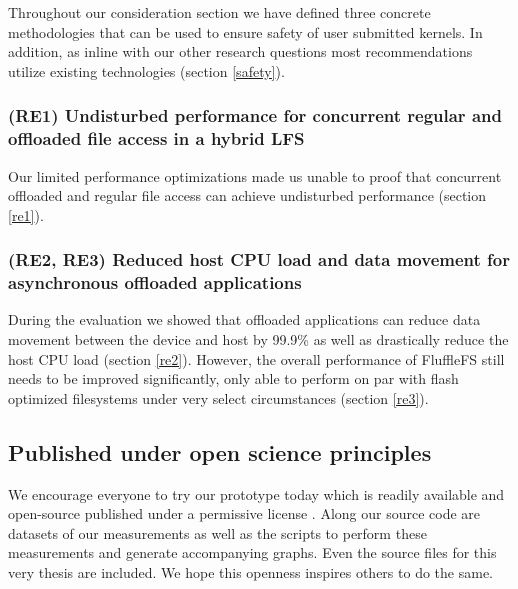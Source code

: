 Throughout our consideration section we have defined three concrete
methodologies that can be used to ensure safety of user submitted kernels.
In addition, as inline with our other research questions most recommendations
utilize existing technologies (section \ref{safety}).

\subsubsection*{(RE1) Undisturbed performance for concurrent regular and
offloaded file access in a hybrid LFS}

Our limited performance optimizations made us unable to proof that concurrent
offloaded and regular file access can achieve undisturbed performance
(section \ref{re1}).

\subsubsection*{(RE2, RE3) Reduced host CPU load and data movement for
asynchronous offloaded applications}

During the evaluation we showed that offloaded applications can reduce
data movement between the device and host by 99.9\% as well as drastically
reduce the host CPU load (section \ref{re2}). However, the overall performance of FluffleFS still
needs to be improved significantly, only able to perform on par with flash
optimized filesystems under very select circumstances (section \ref{re3}). 

\subsection*{Published under open science principles}

We encourage everyone to try our prototype today which is readily available
and open-source published under a permissive license \cite{qemu-csd}. Along our
source code are datasets of our measurements as well as the scripts to perform
these measurements and generate accompanying graphs. Even the source files for
this very thesis are included. We hope this openness inspires others to do the
same.

